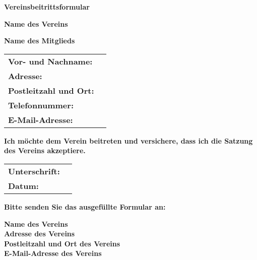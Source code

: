 \documentclass{article}
\begin{document}
\begin{center}
\Large\textbf{Vereinsbeitrittsformular}
\end{center}

\begin{center}
\textbf{Name des Vereins}
\end{center}

\begin{center}
\textbf{Name des Mitglieds}
\end{center}

\begin{tabular}{p{3cm} p{9cm}}
\textbf{Vor- und Nachname:} & \\
\textbf{Adresse:} & \\
\textbf{Postleitzahl und Ort:} & \\
\textbf{Telefonnummer:} & \\
\textbf{E-Mail-Adresse:} & \\
\end{tabular}

\begin{center}
\textbf{Ich möchte dem Verein beitreten und versichere, dass ich die Satzung des Vereins akzeptiere.}
\end{center}

\begin{tabular}{p{3cm} p{9cm}}
\textbf{Unterschrift:} & \\
\textbf{Datum:} & \\
\end{tabular}

\begin{center}
\textbf{Bitte senden Sie das ausgefüllte Formular an:}
\end{center}

\begin{center}
\textbf{Name des Vereins} \\
\textbf{Adresse des Vereins} \\
\textbf{Postleitzahl und Ort des Vereins} \\
\textbf{E-Mail-Adresse des Vereins}
\end{center}
\end{document}
